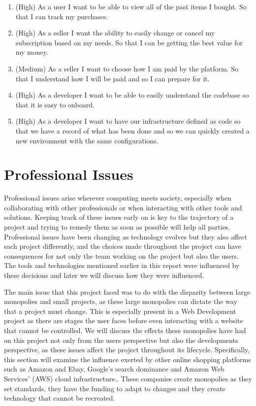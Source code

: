 \documentclass[]{project_report}
\begin{document}
\begin{enumerate}
    \item (High) As a user I want to be able to view all of the past items I bought. So that I can track my purchases.
    \item (High) As a seller I want the ability to easily change or cancel my subscription based on my needs. So that I can be getting the best value for my money.
    \item (Medium) As a seller I want to choose how I am paid by the platform. So that I understand how I will be paid and so I can prepare for it.
    \item (High) As a developer I want to be able to easily understand the codebase so that it is easy to onboard.
    \item (High) As a developer I want to have our infrastructure defined as code so that we have a record of what has been done and so we can quickly created a new environment with the same configurations.
\end{enumerate}

\section{Professional Issues}

Professional issues arise wherever computing meets society, especially when collaborating with other professionals or when interacting with other tools and solutions. Keeping track of these issues early on is key to the trajectory of a project and trying to remedy them as soon as possible will help all parties. Professional issues have been changing as technology evolves but they also affect each project differently, and the choices made throughout the project can have consequences for not only the team working on the project but also the users. The tools and technologies mentioned earlier in this report were influenced by these decisions and later we will discuss how they were influenced.

The main issue that this project faced was to do with the disparity between large monopolies and small projects, as these large monopolies can dictate the way that a project must change. This is especially present in a Web Development project as there are stages the user faces before even interacting with a website that cannot be controlled. We will discuss the effects these monopolies have had on this project not only from the users perspective but also the developments perspective, as these issues affect the project throughout its lifecycle. Specifically, this section will examine the influence exerted by other online shopping platforms such as Amazon and Ebay, Google's search dominance and Amazon Web Services' (AWS) cloud infrastructure.. These companies create monopolies as they set standards, they have the funding to adapt to changes and they create technology that cannot be recreated.
\end{document}
